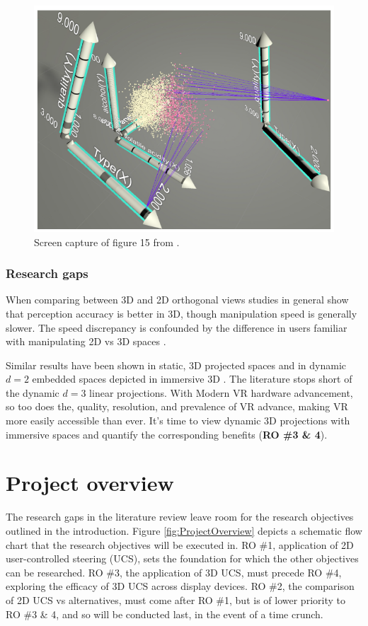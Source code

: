 \documentclass{monashthesis}
\begin{document}
\begin{figure}

{\centering \includegraphics[width=0.5\linewidth]{./figures/cordeil2017fig} 

}

\caption{Screen capture of figure 15 from
\textcite{cordeil_imaxes:_2017}.}\label{fig:cordeil2017fig}
\end{figure}

\subsection{Research gaps}\label{research-gaps-1}

When comparing between 3D and 2D orthogonal views studies in general
show that perception accuracy is better in 3D, though manipulation speed
is generally slower. The speed discrepancy is confounded by the
difference in users familiar with manipulating 2D vs 3D spaces
\autocites{lee_effects_1986}{wickens_implications_1994}{tory_visualization_2006}[counter
example][]{sedlmair_empirical_2013}.

Similar results have been shown in static, 3D projected spaces
\autocites{gracia_new_2016}{wagner_filho_immersive_2018} and in dynamic
\(d=2\) embedded spaces depicted in immersive 3D
\autocite{nelson_xgobi_1998}. The literature stops short of the dynamic
\(d=3\) linear projections. With Modern VR hardware advancement, so too
does the, quality, resolution, and prevalence of VR advance, making VR
more easily accessible than ever. It's time to view dynamic 3D
projections with immersive spaces and quantify the corresponding
benefits (\textbf{RO \#3 \& 4}).

\chapter{Project overview}\label{ch:projectoverview}

The research gaps in the literature review leave room for the research
objectives outlined in the introduction. Figure
\ref{fig:ProjectOverview} depicts a schematic flow chart that the
research objectives will be executed in. RO \#1, application of 2D
user-controlled steering (UCS), sets the foundation for which the other
objectives can be researched. RO \#3, the application of 3D UCS, must
precede RO \#4, exploring the efficacy of 3D UCS across display devices.
RO \#2, the comparison of 2D UCS vs alternatives, must come after RO
\#1, but is of lower priority to RO \#3 \& 4, and so will be conducted
last, in the event of a time crunch.
\end{document}
